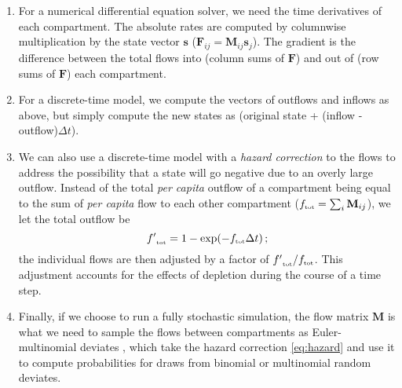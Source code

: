 \documentclass[12pt]{article}\usepackage[]{graphicx}\usepackage[]{color}
\begin{document}
\begin{enumerate}
\item For a numerical differential equation solver, we need the time derivatives of each compartment. The absolute rates are computed by columnwise multiplication by the state vector $\mathbf s$ (${\mathbf F}_{ij} = \mathbf{M}_{ij} \mathbf{s}_j$).
The gradient is the difference between the total flows into (column sums of $\mathbf F$) and out of (row sums of $\mathbf F$) each compartment.
\item For a discrete-time model, we compute the vectors of outflows and inflows as above, but simply compute the new states as (original state + (inflow - outflow)$\Delta t$).
\item We can also use a discrete-time model with a \emph{hazard correction} 
  to the flows to address the possibility that a state will go negative due to an overly large outflow. Instead of the total \emph{per capita} outflow of a compartment being equal to the sum of \emph{per capita} flow to each other compartment (${{f}_{\textrm{\tiny tot}}} = \sum_i {\mathbf M}_{ij}$), we let the total outflow be 
\begin{equation}\label{eq:hazard}
{{f'}_{\textrm{\tiny tot}}} = 1-\exp(-{{f}_{\textrm{\tiny tot}}} \Delta t) \,; 
\end{equation}
the individual flows are then adjusted by a factor of ${{f'}_{\textrm{\tiny tot}}}/{{f}_{\textrm{\tiny tot}}}$.  
This adjustment accounts for the effects of depletion during the course of a time step.
\item Finally, if we choose to run a fully stochastic simulation, the flow matrix $\mathbf M$ is what we need to sample the flows between compartments as Euler-multinomial deviates \cite{breto+09}, which take the hazard correction \eqref{eq:hazard} and use it to compute probabilities for draws from binomial or multinomial random deviates.
\end{enumerate}
\end{document}
